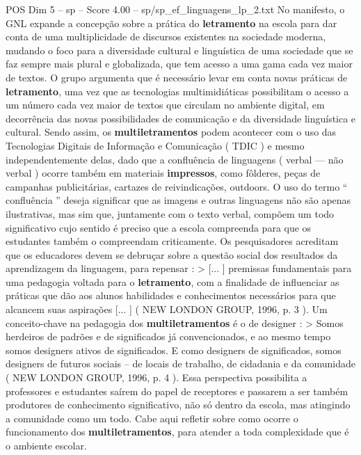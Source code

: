 \begin{textsample}{POS Dim 5 – sp – Score 4.00 – sp/sp\_ef\_linguagens\_lp\_2.txt}  \label{ex:f5_pos_080}
No manifesto, o GNL expande a concepção sobre a prática do \textbf{letramento} na escola para dar conta de uma multiplicidade de discursos existentes na sociedade moderna, mudando o foco para a diversidade cultural e linguística de uma sociedade que se faz sempre mais plural e globalizada, que tem acesso a uma gama cada vez maior de textos.
O grupo argumenta que é necessário levar em conta novas práticas de \textbf{letramento}, uma vez que as tecnologias multimidiáticas possibilitam o acesso a um número cada vez maior de textos que circulam no ambiente digital, em decorrência das novas possibilidades de comunicação e da diversidade linguística e cultural.
Sendo assim, os \textbf{multiletramentos} podem acontecer com o uso das Tecnologias Digitais de Informação e Comunicação ( TDIC ) e mesmo independentemente delas, dado que a confluência de linguagens ( verbal — não verbal ) ocorre também em materiais \textbf{impressos}, como fôlderes, peças de campanhas publicitárias, cartazes de reivindicações, outdoors.
O uso do termo “ confluência ” deseja significar que as imagens e outras linguagens não são apenas ilustrativas, mas sim que, juntamente com o texto verbal, compõem um todo significativo cujo sentido é preciso que a escola compreenda para que os estudantes também o compreendam criticamente.
Os pesquisadores acreditam que os educadores devem se debruçar sobre a questão social dos resultados da aprendizagem da linguagem, para repensar : > [... ] premissas fundamentais para uma pedagogia voltada para o \textbf{letramento}, com a finalidade de influenciar as práticas que dão aos alunos habilidades e conhecimentos necessários para que alcancem suas aspirações [... ] ( NEW LONDON GROUP, 1996, p. 3 ).
Um conceito-chave na pedagogia dos \textbf{multiletramentos} é o de designer : > Somos herdeiros de padrões e de significados já convencionados, e ao mesmo tempo somos designers ativos de significados.
E como designers de significados, somos designers de futuros sociais – de locais de trabalho, de cidadania e da comunidade ( NEW LONDON GROUP, 1996, p. 4 ).
Essa perspectiva possibilita a professores e estudantes saírem do papel de receptores e passarem a ser também produtores de conhecimento significativo, não só dentro da escola, mas atingindo a comunidade como um todo.
Cabe aqui refletir sobre como ocorre o funcionamento dos \textbf{multiletramentos}, para atender a toda complexidade que é o ambiente escolar.

\end{textsample}
